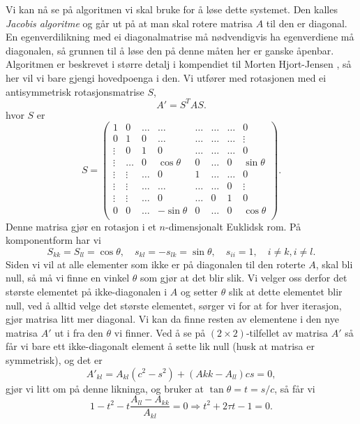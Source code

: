 \documentclass[norsk, 12pt]{article}
\theoremstyle{definition} \newtheorem{defi}{Definisjon}[subsection]
\theoremstyle{definition} \newtheorem{teo}{Teorem}[subsection]
\theoremstyle{definition} \newtheorem*{eks}{Eksempel}
\begin{document}
Vi kan nå se på algoritmen vi skal bruke for å løse dette systemet. Den kalles \emph{Jacobis algoritme} og går ut på at man skal rotere matrisa $A$ til den er diagonal. En egenverdilikning med ei diagonalmatrise må nødvendigvis ha egenverdiene må diagonalen, så grunnen til å løse den på denne måten her er ganske åpenbar. Algoritmen er beskrevet i større detalj i kompendiet til Morten Hjort-Jensen \cite[p.~215-220]{MHJ15}, så her vil vi bare gjengi hovedpoenga i den. Vi utfører med rotasjonen med ei antisymmetrisk rotasjonsmatrise $S$,
$$ A' = S^T A S. $$ 
hvor $S$ er
\begin{equation*}
S = \left(\begin{matrix}
1 & 0 & \ldots & \ldots & \ldots & \ldots & \ldots & 0 \\
0 & 1 & 0 & \ldots & \ldots & \ldots & \ldots & \vdots \\
\vdots & 0 & 1 & 0 & \ldots & \ldots & \ldots & 0 \\
\vdots & \ldots & 0 & \cos\theta & 0 & \ldots & 0 & \sin\theta \\
\vdots & \vdots & \ldots & 0 & 1 & \ldots & \ldots & 0 \\
\vdots & \vdots & \ldots & \ldots & \ldots & \ldots & 0 & \vdots \\
\vdots & \vdots & \ldots & 0 & \ldots & 0 & 1 & 0 \\
0 & 0 & \ldots & -\sin\theta & 0 & \ldots & 0 & \cos \theta \\
\end{matrix}\right).
\end{equation*}
Denne matrisa gjør en rotasjon i et $n$-dimensjonalt Euklidsk rom. På komponentform har vi
$$ S_{kk} = S_{ll} = \cos\theta,\quad s_{kl} = -s_{lk} = \sin\theta,\quad s_{ii} = 1,\quad i \neq k, i \neq l. $$
Siden vi vil at alle elementer som ikke er på diagonalen til den roterte $A$, skal bli null, så må vi finne en vinkel $\theta$ som gjør at det blir slik. Vi velger oss derfor det største elementet på ikke-diagonalen i $A$ og setter $\theta$ slik at dette elementet blir null, ved å alltid velge det største elementet, sørger vi for at for hver iterasjon, gjør matrisa litt mer diagonal. Vi kan da finne resten av elementene i den nye matrisa $A'$ ut i fra den $\theta$ vi finner. Ved å se på $(2\times2)$-tilfellet av matrisa $A'$ så får vi bare ett ikke-diagonalt element å sette lik null (husk at matrisa er symmetrisk), og det er
$$ A'_{kl} = A_{kl}(c^2 - s^2) + (A{kk} - A_{ll}) cs = 0, $$
gjør vi litt om på denne likninga, og bruker at $\tan\theta = t = s/c$, så får vi
$$  1 - t^2 - t \frac{A_{ll} - A_{kk}}{A_{kl}} = 0 \Rightarrow t^2 + 2\tau t - 1 = 0.  $$
\end{document}
